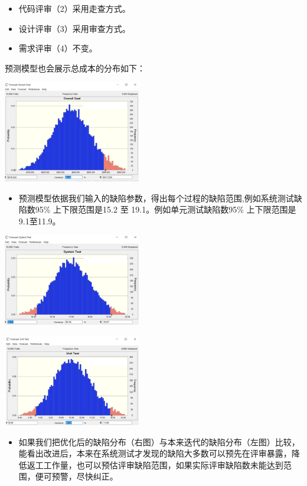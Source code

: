 \begin{itemize}
\tightlist
\item
  代码评审（2）采用走查方式。
\item
  设计评审（3）采用审查方式。
\item
  需求评审（4）不变。
\end{itemize}

预测模型也会展示总成本的分布如下：

\includegraphics[width=6cm]{微信截图_20231206090941.png}

\begin{itemize}
\tightlist
\item
  预测模型依据我们输入的缺陷参数，得出每个过程的缺陷范围,例如系统测试缺陷数95\%
  上下限范围是15.2 至 19.1。例如单元测试缺陷数95\% 上下限范围是9.1至11.9。
\end{itemize}

\includegraphics[width=6cm]{微信截图_20231206091103.png}

\includegraphics[width=6cm]{微信截图_20231206091239.png}

\begin{itemize}
\tightlist
\item
  如果我们把优化后的缺陷分布（右图）与本来迭代的缺陷分布（左图）比较，能看出改进后，本来在系统测试才发现的缺陷大多数可以预先在评审暴露，降低返工工作量，也可以预估评审缺陷范围，如果实际评审缺陷数未能达到范围，便可预警，尽快纠正。
\end{itemize}

